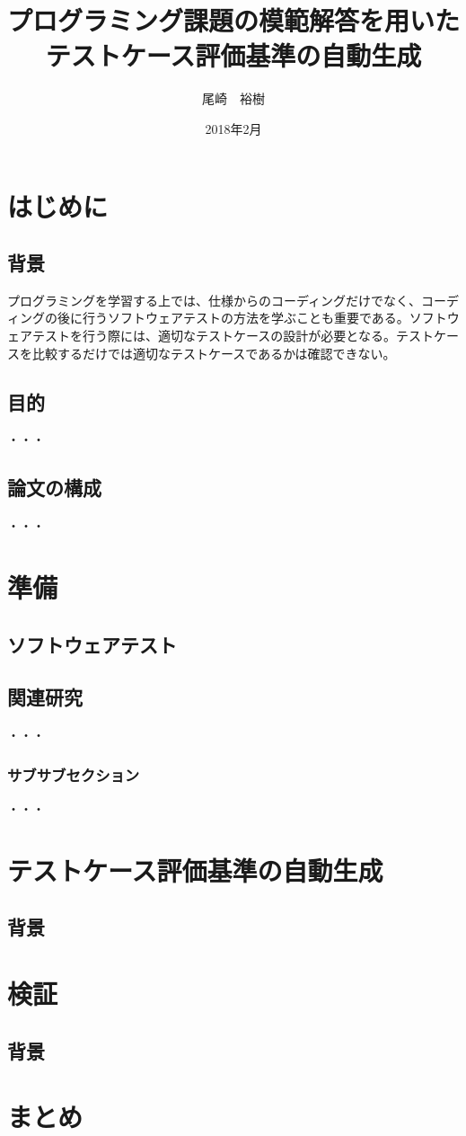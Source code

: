 \documentclass{tpu-sotu}
\author{尾崎　裕樹}
\title{プログラミング課題の模範解答を用いた\\テストケース評価基準の自動生成}
\date{2018年2月}
\begin{document}
%
\maketitle
\clearpage
{}
\tableofcontents
\clearpage
{}
%

%
\chapter{はじめに}
\section{背景}
プログラミングを学習する上では、仕様からのコーディングだけでなく、コーディングの後に行うソフトウェアテストの方法を学ぶことも重要である。ソフトウェアテストを行う際には、適切なテストケースの設計が必要となる。テストケースを比較するだけでは適切なテストケースであるかは確認できない。
\section{目的}
  ・・・
\section{論文の構成}
  ・・・
\chapter{準備}
\section{ソフトウェアテスト}
\section{関連研究}
  ・・・
\subsection{サブサブセクション}
  ・・・
\chapter{テストケース評価基準の自動生成}
\section{背景}
\chapter{検証}
\section{背景}
\chapter{まとめ}
\end{document}

